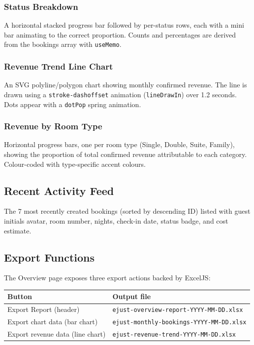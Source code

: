\documentclass[12pt,a4paper]{report}
\begin{document}
\subsubsection{Status Breakdown}

A horizontal stacked progress bar followed by per-status rows, each with
a mini bar animating to the correct proportion. Counts and percentages are
derived from the bookings array with \texttt{useMemo}.

\subsubsection{Revenue Trend Line Chart}

An SVG polyline/polygon chart showing monthly confirmed revenue. The line
is drawn using a \texttt{stroke-dashoffset} animation (\texttt{lineDrawIn})
over 1.2 seconds. Dots appear with a \texttt{dotPop} spring animation.

\subsubsection{Revenue by Room Type}

Horizontal progress bars, one per room type (Single, Double, Suite, Family),
showing the proportion of total confirmed revenue attributable to each
category. Colour-coded with type-specific accent colours.

\subsection{Recent Activity Feed}

The 7 most recently created bookings (sorted by descending ID) listed with
guest initials avatar, room number, nights, check-in date, status badge,
and cost estimate.

\subsection{Export Functions}

The Overview page exposes three export actions backed by ExcelJS:

\begin{center}
\begin{tabular}{ll}
  \toprule
  \textbf{Button} & \textbf{Output file} \\
  \midrule
  Export Report (header)         & \texttt{ejust-overview-report-YYYY-MM-DD.xlsx} \\
  Export chart data (bar chart)  & \texttt{ejust-monthly-bookings-YYYY-MM-DD.xlsx} \\
  Export revenue data (line chart) & \texttt{ejust-revenue-trend-YYYY-MM-DD.xlsx} \\
  \bottomrule
\end{tabular}
\end{center}
\end{document}
